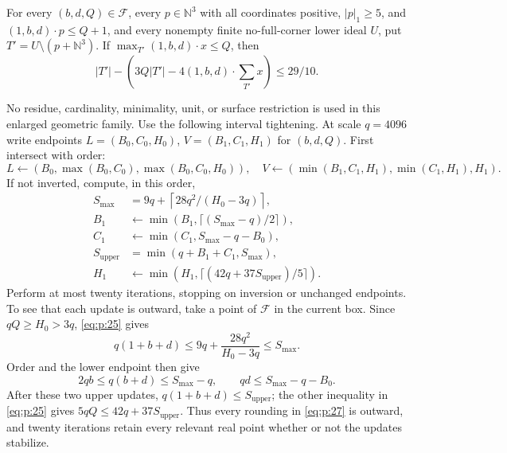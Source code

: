 \begin{finitelemma}\label{finite:high-height}
For every \((b,d,Q)\in\mathcal F\), every \(p\in\mathbb N^3\) with all
coordinates positive, \(|p|_1\ge5\), and
\((1,b,d)\cdot p\le Q+1\), and every nonempty finite no-full-corner lower ideal \(U\),
put \(T'=U\setminus(p+\mathbb N^3)\). If
\(\max_{T'}(1,b,d)\cdot x\le Q\), then
\begin{equation}
|T'|-\left(3Q|T'|-4(1,b,d)\cdot\sum_{T'}x\right)\le29/10.
\label{eq:p:26}
\end{equation}

\end{finitelemma}

No residue, cardinality, minimality, unit, or surface restriction is used
in this enlarged geometric family.
Use the following interval tightening. At scale \(q=4096\) write endpoints
\(L=(B_0,C_0,H_0)\), \(V=(B_1,C_1,H_1)\) for \((b,d,Q)\).
First intersect with order:
\[
L\leftarrow(B_0,\max(B_0,C_0),\max(B_0,C_0,H_0)),\quad
V\leftarrow(\min(B_1,C_1,H_1),\min(C_1,H_1),H_1).
\]
If not inverted, compute, in this order,
\begin{equation}
\begin{aligned}
S_{\max}&=9q+\left\lceil28q^2/(H_0-3q)\right\rceil,\\
B_1&\leftarrow\min(B_1,\lceil(S_{\max}-q)/2\rceil),\\
C_1&\leftarrow\min(C_1,S_{\max}-q-B_0),\\
S_{\mathrm{upper}}&=\min(q+B_1+C_1,S_{\max}),\\
H_1&\leftarrow\min(H_1,\lceil(42q+37S_{\mathrm{upper}})/5\rceil).
\end{aligned}
\label{eq:p:27}
\end{equation}
Perform at most twenty iterations, stopping on inversion or unchanged
endpoints. To see that each update is outward, take a point of \(\mathcal F\)
in the current box. Since \(qQ\ge H_0>3q\), \eqref{eq:p:25} gives
\[
q(1+b+d)\le9q+\frac{28q^2}{H_0-3q}\le S_{\max}.
\]
Order and the lower endpoint then give
\[
2qb\le q(b+d)\le S_{\max}-q,\qquad
qd\le S_{\max}-q-B_0.
\]
After these two upper updates, \(q(1+b+d)\le S_{\mathrm{upper}}\);
the other inequality in \eqref{eq:p:25} gives
\(5qQ\le42q+37S_{\mathrm{upper}}\).
Thus every rounding in \eqref{eq:p:27} is outward, and twenty iterations
retain every relevant real point whether or not the updates stabilize.

